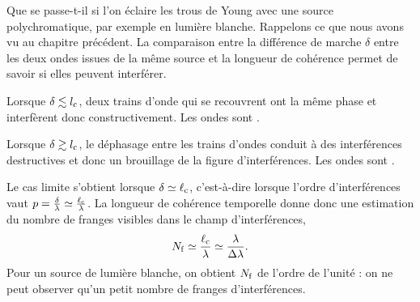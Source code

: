 \documentclass[12pt,fancy]{cours}
\begin{document}
Que se passe-t-il si l'on éclaire les trous de Young avec une source polychromatique, par exemple en lumière blanche. Rappelons ce que nous avons vu au chapitre précédent. 
La comparaison entre la différence de marche $\delta$ entre les deux ondes issues de la même source et la longueur de cohérence permet de savoir si elles peuvent interférer.

\begin{liste}
\item Lorsque $\delta \lesssim l_{\rm{c}}$,  deux trains d'onde qui se recouvrent ont la même phase et interfèrent donc constructivement. Les ondes sont .

\item Lorsque $\delta \gtrsim  l_{\rm{c}}$, le déphasage entre les trains d'ondes conduit à des interférences destructives et donc un brouillage de la figure d'interférences. Les ondes sont .
\end{liste}
Le cas limite s'obtient lorsque $\delta \simeq \ell_{\rm c}$, c'est-à-dire lorsque l'ordre d'interférences vaut $p=\frac{\delta}{\lambda} \simeq \frac{\ell_{\rm c}}{\lambda}$. La longueur de cohérence temporelle donne donc une estimation du nombre de franges visibles dans le champ d'interférences,
\begin{equation}
  N_{\rm{f}}\simeq \frac{\ell_{\rm c}}{\lambda}\simeq\frac{\lambda}{\Delta\lambda}.
  \end{equation}
Pour un source de lumière blanche, on obtient $N_{\rm f}$ de l'ordre de l'unité : on ne peut observer qu'un petit nombre de franges d'interférences. 
\end{document}
